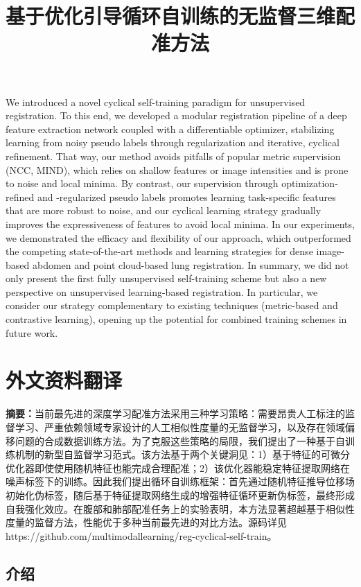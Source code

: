 We introduced a novel cyclical self-training paradigm for unsupervised registration. To this end, we developed a modular registration pipeline of a deep feature extraction network coupled with a differentiable optimizer, stabilizing learning from noisy pseudo labels through regularization and iterative, cyclical refinement. That way, our method avoids pitfalls of popular metric supervision (NCC, MIND), which relies on shallow features or image intensities and is prone to noise and local minima. By contrast, our supervision through optimization-refined and -regularized pseudo labels promotes learning task-specific features that are more robust to noise, and our cyclical learning strategy gradually improves the expressiveness of features to avoid local minima. In our experiments, we demonstrated the efficacy and flexibility of our approach, which outperformed the competing state-of-the-art methods and learning strategies for dense image-based abdomen and point cloud-based lung registration. In summary, we did not only present the first fully unsupervised self-training scheme but also a new perspective on unsupervised learning-based registration. In particular, we consider our strategy complementary to existing techniques (metric-based and contrastive learning), opening up the potential for combined training schemes in future work.



\chapter{外文资料翻译}
\label{cha:chorg}
\title{基于优化引导循环自训练的无监督三维配准方法}
\textbf{摘要：}当前最先进的深度学习配准方法采用三种学习策略：需要昂贵人工标注的监督学习、严重依赖领域专家设计的人工相似性度量的无监督学习，以及存在领域偏移问题的合成数据训练方法。为了克服这些策略的局限，我们提出了一种基于自训练机制的新型自监督学习范式。该方法基于两个关键洞见：1）基于特征的可微分优化器即使使用随机特征也能完成合理配准；2）该优化器能稳定特征提取网络在噪声标签下的训练。因此我们提出循环自训练框架：首先通过随机特征推导位移场初始化伪标签，随后基于特征提取网络生成的增强特征循环更新伪标签，最终形成自我强化效应。在腹部和肺部配准任务上的实验表明，本方法显著超越基于相似性度量的监督方法，性能优于多种当前最先进的对比方法。源码详见 https://github.com/multimodallearning/reg-cyclical-self-train。

\section{介绍}


